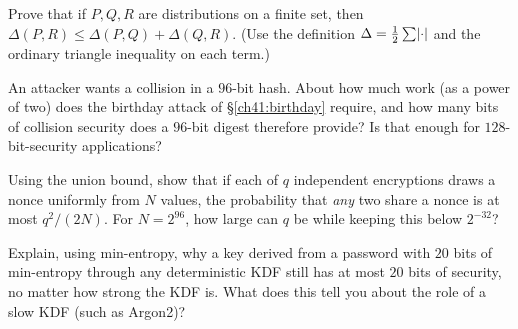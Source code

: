 \begin{exercise}
Prove that if $P,Q,R$ are distributions on a finite set, then $\Delta(P,R)\le
\Delta(P,Q)+\Delta(Q,R)$. (Use the definition $\Delta=\tfrac12\sum\lvert\cdot\rvert$ and
the ordinary triangle inequality on each term.)
\end{exercise}

\begin{exercise}
An attacker wants a collision in a $96$-bit hash. About how much work (as a power
of two) does the birthday attack of \S\ref{ch41:birthday} require, and how many
bits of collision security does a $96$-bit digest therefore provide? Is that enough
for $128$-bit-security applications?
\end{exercise}

\begin{exercise}
Using the union bound, show that if each of $q$ independent encryptions draws a
nonce uniformly from $N$ values, the probability that \emph{any} two share a nonce
is at most $q^2/(2N)$. For $N=2^{96}$, how large can $q$ be while keeping this below
$2^{-32}$?
\end{exercise}

\begin{exercise}
Explain, using min-entropy, why a key derived from a password with $20$ bits of
min-entropy through any deterministic KDF still has at most $20$ bits of security,
no matter how strong the KDF is. What does this tell you about the role of a slow
KDF (such as Argon2)?
\end{exercise}
